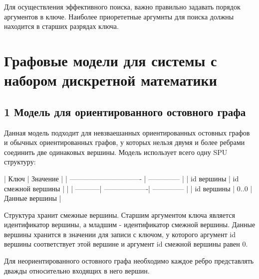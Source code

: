 Для осуществления эффективного поиска, важно правильно задавать порядок аргументов в ключе. Наиболее приорететные аргумнты для поиска должны находится в старших разрядах ключа.\hypertarget{md_docs__xD0_x93_xD1_x80_xD0_xB0_xD1_x84_xD0_xBE_xD0_xB2_xD1_x8B_xD0_xB5__xD0_xBC_xD0_xBE_xD0_xB4_xD0_xB5_xD0_xBB_xD0_xB8_autotoc_md3}{}\section{Графовые модели для системы с набором дискретной математики}\label{md_docs__xD0_x93_xD1_x80_xD0_xB0_xD1_x84_xD0_xBE_xD0_xB2_xD1_x8B_xD0_xB5__xD0_xBC_xD0_xBE_xD0_xB4_xD0_xB5_xD0_xBB_xD0_xB8_autotoc_md3}
\hypertarget{md_docs__xD0_x93_xD1_x80_xD0_xB0_xD1_x84_xD0_xBE_xD0_xB2_xD1_x8B_xD0_xB5__xD0_xBC_xD0_xBE_xD0_xB4_xD0_xB5_xD0_xBB_xD0_xB8_autotoc_md4}{}\subsection{1 Модель для ориентированного остовного графа}\label{md_docs__xD0_x93_xD1_x80_xD0_xB0_xD1_x84_xD0_xBE_xD0_xB2_xD1_x8B_xD0_xB5__xD0_xBC_xD0_xBE_xD0_xB4_xD0_xB5_xD0_xBB_xD0_xB8_autotoc_md4}
Данная модель подходит для невзваешанных ориентированных остовных графов и обычных ориентированных графов, у которых нельзя двумя и более ребрами соединить две одинаковых вершины. Модель использует всего одну S\+PU структуру\+:


\begin{DoxyCode}
| Ключ                            | Значение       |
| ------------------------------- | -------------- |
| id вершины | id смежной вершины |                |
| -----------| -------------------| -------------- |
| id вершины | 0..0               | Данные вершины | 
\end{DoxyCode}


Структура хранит смежные вершины. Старшим аргументом ключа является идентификатор вершины, а младшим -\/ идентификатор смежной вершины. Данные вершины хранится в значении для записи с ключом, у которого аргумент {\ttfamily id вершины} соответствует этой вершине и аргумент {\ttfamily id смежной вершины} равен 0.

Для неориентированного остовного графа необходимо каждое ребро представлять дважды относительно входящих в него вершин.

